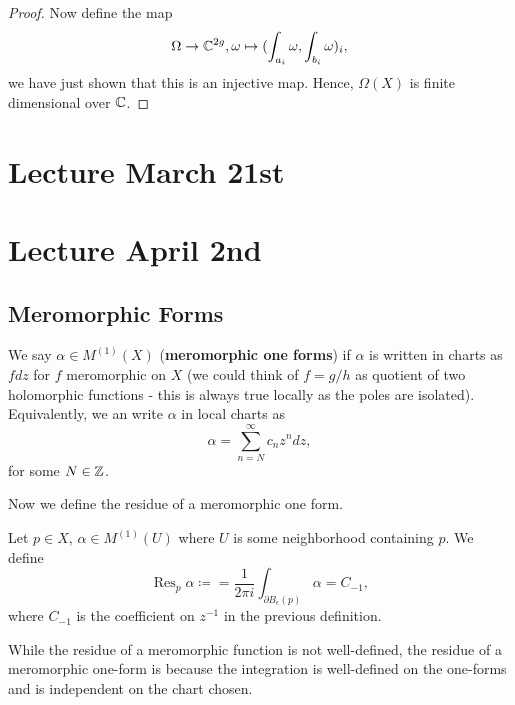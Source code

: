 \documentclass{article}
\begin{document}
{\begin{proof}
    Now define the map
    \[\Omega \to \mathbb{C}^{2g}, \omega \mapsto (\int_{a_i} \omega, \int_{b_i} \omega)_i,\]
    we have just shown that this is an injective map. Hence, $\Omega(X)$ is finite dimensional over $\mathbb{C}$.

\end{proof}

\newpage
\section{Lecture March 21st}

\newpage
\section{Lecture April 2nd}

\subsection{Meromorphic Forms}

\begin{definition}
    We say $\alpha \in M^{(1)}(X)$ (\textbf{meromorphic one forms}) if $\alpha$ is written in charts as $f dz$ for $f$ meromorphic on $X$ (we could think of $f = g/h$ as quotient of two holomorphic functions - this is always true locally as the poles are isolated). Equivalently, we an write $\alpha$ in local charts as
    \[\alpha = \sum_{n = N}^\infty c_n z^n dz, \]
    for some $N \in \mathbb{Z}$.
\end{definition}

Now we define the residue of a meromorphic one form.
\begin{definition}
    Let $p \in X$, $\alpha \in M^{(1)}(U)$ where $U$ is some neighborhood containing $p$. We define 
    \[\operatorname{Res}_p \alpha \coloneqq = \frac{1}{2\pi i} \int_{\partial B_\epsilon(p)} \alpha = C_{-1},\]
    where $C_{-1}$ is the coefficient on $z^{-1}$ in the previous definition.
\end{definition}

\begin{remark}
    While the residue of a meromorphic function is not well-defined, the residue of a meromorphic one-form is because the integration is well-defined on the one-forms and is independent on the chart chosen.
\end{remark}

}
\end{document}
